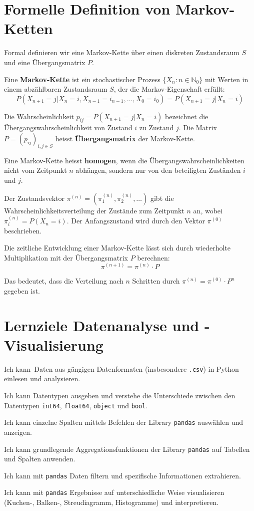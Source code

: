 \chapter{Formelle Definition von Markov-Ketten}\label{ch:markov-formal}

Formal definieren wir eine Markov-Kette über einen diskreten Zustandsraum $S$ und eine Übergangsmatrix $P$.

\begin{mydefinition}
Eine \textbf{Markov-Kette} ist ein stochastischer Prozess $\{X_n : n \in \mathbb{N}_0\}$ mit Werten in einem abzählbaren Zustandsraum $S$, der die Markov-Eigenschaft erfüllt:
\[
    P(X_{n+1} = j | X_n = i, X_{n-1} = i_{n-1}, \ldots, X_0 = i_0) = P(X_{n+1} = j | X_n = i)
\]

Die Wahrscheinlichkeit $p_{ij} = P(X_{n+1} = j | X_n = i)$ bezeichnet die Übergangswahrscheinlichkeit von Zustand $i$ zu Zustand $j$. Die Matrix $P = (p_{ij})_{i,j \in S}$ heisst \textbf{Übergangsmatrix} der Markov-Kette.

Eine Markov-Kette heisst \textbf{homogen}, wenn die Übergangswahrscheinlichkeiten nicht vom Zeitpunkt $n$ abhängen, sondern nur von den beteiligten Zuständen $i$ und $j$.
\end{mydefinition}

Der Zustandsvektor $\pi^{(n)} = (\pi_1^{(n)}, \pi_2^{(n)}, \ldots)$ gibt die Wahrscheinlichkeitsverteilung der Zustände zum Zeitpunkt $n$ an, wobei $\pi_i^{(n)} = P(X_n = i)$. Der Anfangszustand wird durch den Vektor $\pi^{(0)}$ beschrieben.

Die zeitliche Entwicklung einer Markov-Kette lässt sich durch wiederholte Multiplikation mit der Übergangsmatrix $P$ berechnen:
\[
    \pi^{(n+1)} = \pi^{(n)} \cdot P
\]

Das bedeutet, dass die Verteilung nach $n$ Schritten durch $\pi^{(n)} = \pi^{(0)} \cdot P^n$ gegeben ist.

\chapter{Lernziele Datenanalyse und -Visualisierung}
\begin{todolist}
  \item Ich kann Daten aus gängigen Datenformaten (insbesondere \texttt{.csv}) in Python einlesen und analysieren.
  \item Ich kann Datentypen ausgeben und verstehe die Unterschiede zwischen den Datentypen \texttt{int64}, \texttt{float64}, \texttt{object} und \texttt{bool}.
  \item Ich kann einzelne Spalten mittels Befehlen der Library \texttt{pandas} auswählen und anzeigen.
  \item Ich kann grundlegende Aggregationsfunktionen der Library \texttt{pandas} auf Tabellen und Spalten anwenden.
  \item Ich kann mit \texttt{pandas} Daten filtern und spezifische Informationen extrahieren.
  \item Ich kann mit \texttt{pandas} Ergebnisse auf unterschiedliche Weise visualisieren (Kuchen-, Balken-, Streudiagramm, Histogramme) und interpretieren.
\end{todolist}

